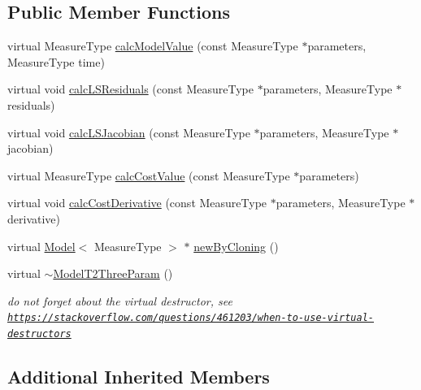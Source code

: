 \subsection*{Public Member Functions}
\begin{DoxyCompactItemize}
\item 
virtual Measure\-Type \hyperlink{class_ox_1_1_model_t2_three_param_a2ed5138a6db7e8b64c5c8d8275de70ac}{calc\-Model\-Value} (const Measure\-Type $\ast$parameters, Measure\-Type time)
\item 
virtual void \hyperlink{class_ox_1_1_model_t2_three_param_af959d697820c70df520f987ba5e75b78}{calc\-L\-S\-Residuals} (const Measure\-Type $\ast$parameters, Measure\-Type $\ast$residuals)
\item 
virtual void \hyperlink{class_ox_1_1_model_t2_three_param_a727daa3a07d63fc3efbf0559ce32de9b}{calc\-L\-S\-Jacobian} (const Measure\-Type $\ast$parameters, Measure\-Type $\ast$jacobian)
\item 
virtual Measure\-Type \hyperlink{class_ox_1_1_model_t2_three_param_afa54ff1c8de4f2c2cf2fd50e3e357e2b}{calc\-Cost\-Value} (const Measure\-Type $\ast$parameters)
\item 
virtual void \hyperlink{class_ox_1_1_model_t2_three_param_a296bdf8378923d3e501c6e929608baca}{calc\-Cost\-Derivative} (const Measure\-Type $\ast$parameters, Measure\-Type $\ast$derivative)
\item 
virtual \hyperlink{class_ox_1_1_model}{Model}$<$ Measure\-Type $>$ $\ast$ \hyperlink{class_ox_1_1_model_t2_three_param_a7a6d2bae4e394a99e9e8943af9f344d0}{new\-By\-Cloning} ()
\item 
\hypertarget{class_ox_1_1_model_t2_three_param_a504f1b6e964c67bbf251469f2ae880ff}{virtual \hyperlink{class_ox_1_1_model_t2_three_param_a504f1b6e964c67bbf251469f2ae880ff}{$\sim$\-Model\-T2\-Three\-Param} ()}\label{class_ox_1_1_model_t2_three_param_a504f1b6e964c67bbf251469f2ae880ff}

\begin{DoxyCompactList}\small\item\em do not forget about the virtual destructor, see \href{https://stackoverflow.com/questions/461203/when-to-use-virtual-destructors}{\tt https\-://stackoverflow.\-com/questions/461203/when-\/to-\/use-\/virtual-\/destructors} \end{DoxyCompactList}\end{DoxyCompactItemize}
\subsection*{Additional Inherited Members}


